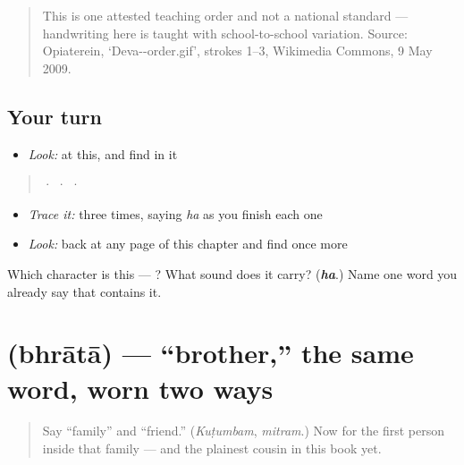 \begin{quote}
This is one attested teaching order and not a national standard — handwriting here is taught with school-to-school variation. Source: Opiaterein, ‘Deva--order.gif’, strokes 1–3, Wikimedia Commons, 9 May 2009.
\end{quote}

\subsection*{Your turn}
\begin{itemize}
\raggedright
  \item \emph{Look:} at this, and find  in it
\end{itemize}

\begin{quote}
  ·      ·   · 
\end{quote}

\begin{itemize}
\raggedright
  \item \emph{Trace it:}  three times, saying \emph{ha} as you finish each one
  \item \emph{Look:} back at any page of this chapter and find  once more
\end{itemize}

\begin{tcolorbox}[breakable,colback=teal!4,colframe=teal!35!black,title={Before you move on}]
Which character is this — ? What sound does it carry? (\emph{\textbf{ha}}.) Name one word you already say that contains it.
\end{tcolorbox}
\section[\texorpdfstring{\sk{भ्राता} (bhrātā)}{भ्राता (bhrātā)}]{ (bhrātā) — \textquotedblleft{}brother,\textquotedblright{} the same word, worn two ways}

\label{lesson:SA-C11-bhrata}



\begin{quote}
Say \textquotedblleft{}family\textquotedblright{} and \textquotedblleft{}friend.\textquotedblright{} (\emph{Kuṭumbam}, \emph{mitram}.) Now for the first person inside that family — and the plainest cousin in this book yet.
\end{quote}

